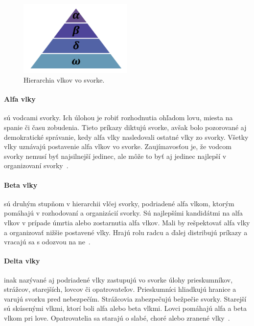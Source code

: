 \documentclass[a4paper,slovak,12pt,appendix]{article}
\begin{document}
\begin{figure}[!ht]
  \centering
  \includegraphics[width=0.5\textwidth]{wolf_hierarchy.png}
  \caption{Hierarchia vlkov vo svorke.}
  \label{fig-wolf-hierarchy}
\end{figure}

\paragraph{Alfa vlky} sú vodcami svorky. Ich úlohou je robiť rozhodnutia
ohľadom lovu, miesta na spanie či času zobudenia. Tieto príkazy diktujú svorke,
avšak bolo pozorované aj demokratické správanie, kedy alfa vlky nasledovali
ostatné vlky zo svorky. Všetky vlky uznávajú postavenie alfa vlkov vo svorke.
Zaujímavosťou je, že vodcom svorky nemusí byť najsilnejší jedinec, ale môže to
byť aj jedinec najlepší v organizovaní svorky~\cite{Seeley1991}.

\paragraph{Beta vlky} sú druhým stupňom v hierarchii vlčej svorky, podriadené
alfa vlkom, ktorým pomáhajú v rozhodovaní a organizácií svorky. Sú najlepšími
kandidátmi na alfa vlkov v prípade úmrtia alebo zostarnutia alfa vlkov. Mali by
rešpektovať alfa vlky a organizovať nižšie postavené vlky. Hrajú rolu radcu
a ďalej distribujú príkazy a vracajú sa s odozvou na ne~\cite{Seeley1991}.

\paragraph{Delta vlky} inak nazývané aj podriadené vlky zastupujú vo svorke
úlohy prieskumníkov, strážcov, starejších, lovcov či opatrovateľov.
Prieskumníci hliadkujú hranice a varujú svorku pred nebezpečím. Strážcovia
zabezpečujú bežpečie svorky. Starejší sú skúsenými vlkmi, ktorí boli alfa alebo
beta vlkmi. Lovci pomáhajú alfa a beta vlkom pri love. Opatrovatelia sa starajú
o slabé, choré alebo zranené vlky~\cite{Seeley1991}.
\end{document}
